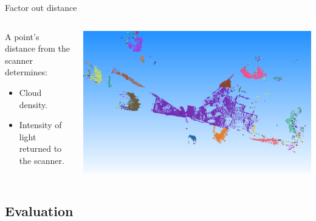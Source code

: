 \documentclass{beamer}
\begin{document}
\begin{frame}{Factor out distance}

\begin{columns}[T]

\begin{column}{0.5\textwidth}

A point's distance from the scanner determines:
\begin{itemize}
\item Cloud density.
\item Intensity of light returned to the scanner.
\end{itemize}

\end{column}

\begin{column}{0.5\textwidth}

\includegraphics[width=1\textwidth]{pics/clustering.png}

\end{column}

\end{columns}
\end{frame}

\subsection{Evaluation}
\end{document}
